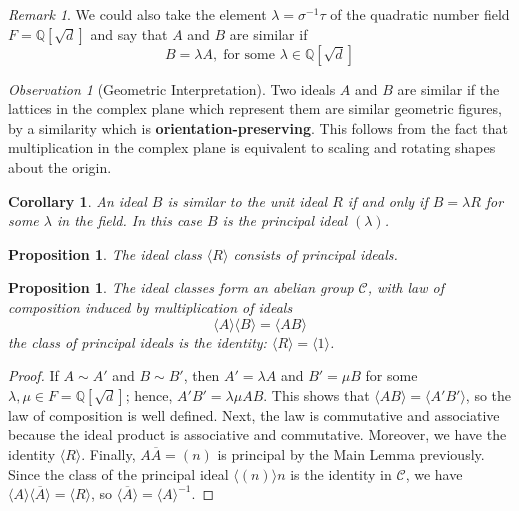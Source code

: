 \documentclass[12pt]{article}
\newtheorem{cor}[thm]{Corollary}
\newtheorem{prop}[thm]{Proposition}
\theoremstyle{definition}
\theoremstyle{remark}
\newtheorem{rmk}[thm]{Remark}
\newtheorem{obs}[thm]{Observation}
\numberwithin{equation}{section}
\newcommand\Q{\mathbb Q}    %
\newcommand\B[1]{\textbf{ #1}}
\begin{document}
\vspace{15pt}

\begin{rmk}
        We could also take the element $\lambda = \sigma^{-1}\tau$ of the quadratic number field $F = \Q[\sqrt{d}]$ and say that $A$ and $B$ are similar if \begin{equation}
                B = \lambda A,\;\text{for some } \lambda \in \Q[\sqrt{d}]
        \end{equation}
\end{rmk}

\vspace{15pt}

\begin{obs}[Geometric Interpretation]
        Two ideals $A$ and $B$ are similar if the lattices in the complex plane which represent them are similar geometric figures, by a similarity which is \B{orientation-preserving}. This follows from the fact that multiplication in the complex plane is equivalent to scaling and rotating shapes about the origin.
\end{obs}

\vspace{15pt}

\begin{cor}
        An ideal $B$ is similar to the unit ideal $R$ if and only if $B = \lambda R$ for some $\lambda$ in the field. In this case $B$ is the principal ideal $(\lambda)$.
\end{cor}

\vspace{15pt}

\begin{prop}
        The ideal class $\langle R \rangle$ consists of principal ideals.
\end{prop}

\vspace{15pt}

\begin{prop}
        The ideal classes form an abelian group $\mathcal{C}$, with law of composition induced by multiplication of ideals \begin{equation}
                \langle A \rangle\langle B \rangle = \langle AB\rangle 
        \end{equation}
        the class of principal ideals is the identity: $\langle R \rangle = \langle 1 \rangle$.
\end{prop}
\begin{proof}
        If $A \sim A'$ and $B \sim B'$, then $A' = \lambda A$ and $B' = \mu B$ for some $\lambda,\mu \in F = \Q[\sqrt{d}]$; hence, $A'B' = \lambda\mu AB$. This shows that $\langle AB\rangle = \langle A'B'\rangle$, so the law of composition is well defined. Next, the law is commutative and associative because the ideal product is associative and commutative. Moreover, we have the identity $\langle R\rangle$. Finally, $A\overline{A}=(n)$ is principal by the Main Lemma previously. Since the class of the principal ideal $\langle (n) \rangle n$ is the identity in $\mathcal{C}$, we have $\langle A\rangle \langle \overline{A}\rangle = \langle R\rangle$, so $\langle \overline{A}\rangle = \langle A\rangle^{-1}$.
\end{proof}
\end{document}
